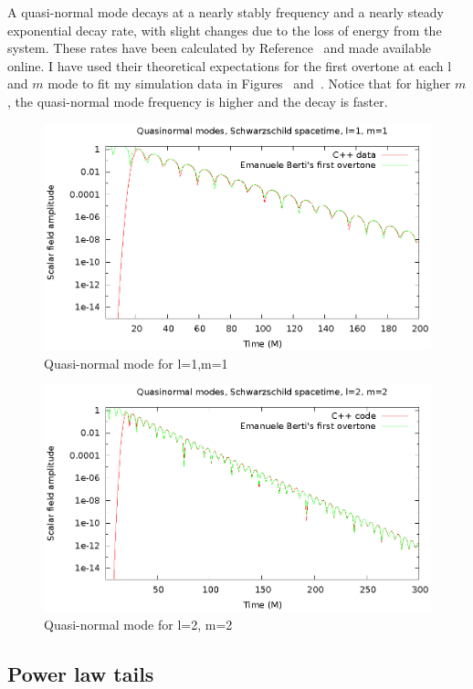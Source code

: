 A quasi-normal mode decays at a nearly stably frequency and a nearly steady exponential decay rate, with slight changes due to the loss of energy from the system. These rates have been calculated by Reference~\cite{bertiSchwQNM} and made available online. I have used their theoretical expectations for the first overtone at each l and $m$ mode to fit my simulation data in Figures~\cite{qnml1m1} and~\cite{qnml2m2}. Notice that for higher $m$, the quasi-normal mode frequency is higher and the decay is faster.

\begin{figure}
  \includegraphics{l1m1qnm}
  \caption{Quasi-normal mode for l=1,m=1}
  \label{qnml1m1}
\end{figure}

\begin{figure}
  \includegraphics{l2m2qnm}
  \caption{Quasi-normal mode for l=2, m=2}
  \label{qnml2m2}
\end{figure}


\subsection{Power law tails}


